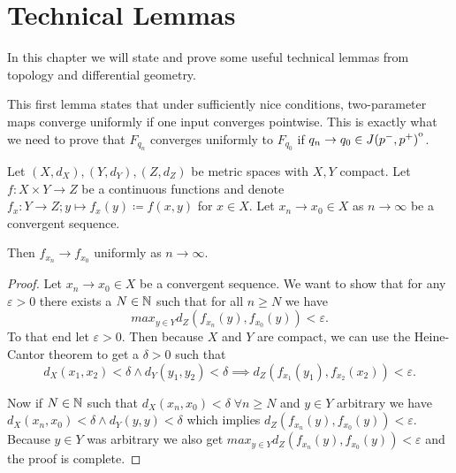 \chapter{Technical Lemmas}
In this chapter we will state and prove some useful technical lemmas from topology and differential geometry.


This first lemma states that under sufficiently nice conditions, two-parameter maps converge uniformly if one input converges pointwise. This is exactly what we need to prove that $F_{q_n}$ converges uniformly to $F_{q_0}$ if $q_n\to q_0\in {\kern0ptJ(p^-,p^+)}^{\mathrm{o}}$.
\begin{lemma}\label{lem:unifconvoncompact}
    Let $(X,d_X),(Y,d_Y),(Z,d_Z)$ be metric spaces with $X,Y$ compact. Let $f:X\times Y\to Z$ be a continuous functions and denote $f_x:Y\to Z;y\mapsto f_x(y)\coloneqq f(x,y)$ for $x\in X$. Let $x_n\to x_0 \in X$ as $n\to\infty$ be a convergent sequence.

    Then $f_{x_n}\to f_{x_0}$ uniformly as $n\to \infty$.
\end{lemma}
\begin{proof}
    Let $x_n\to x_0\in X$ be a convergent sequence. We want to show that for any $\varepsilon > 0$ there exists a $N\in \mathbb{N}$ such that for all $n \ge N$ we have 
    \[
        max_{y\in Y} d_Z(f_{x_n}(y),f_{x_0}(y))<\varepsilon.
    \]
    To that end let $\varepsilon>0$. Then because $X$ and $Y$ are compact, we can use the Heine-Cantor theorem to get a $\delta>0$ such that 
    \[
        d_X(x_1,x_2)<\delta \wedge d_Y(y_1,y_2)<\delta \implies d_Z(f_{x_1}(y_1),f_{x_2}(x_2))<\varepsilon.
    \]

    Now if $N\in \mathbb{N}$ such that $d_X(x_n,x_0)<\delta \; \forall n\ge N$ and $y\in Y$ arbitrary we have 
    $d_X(x_n,x_0)<\delta \wedge d_Y(y,y)<\delta$ which implies $d_Z(f_{x_n}(y),f_{x_0}(y))<\varepsilon$. Because $y\in Y$ was arbitrary we also get $max_{y\in Y} d_Z(f_{x_n}(y),f_{x_0}(y))<\varepsilon$ and the proof is complete.
\end{proof}

